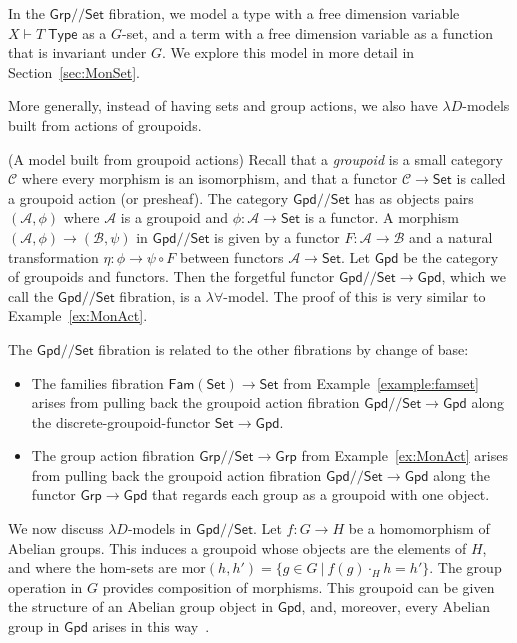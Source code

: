 \documentclass[a4paper,UKenglish]{lipics}
\newcommand{\msf}[1]{\mathsf{#1}} %
\newcommand{\Grp}{\msf{Grp}}
\newcommand{\Set}{\msf{Set}}
\newcommand{\Gpd}{\msf{Gpd}}
\newcommand{\Fam}[1]{\msf{Fam}(#1)}
\newcommand{\A}{\mathcal{A}}
\newcommand{\B}{\mathcal{B}}
\newcommand{\C}{\mathcal{C}}
\newcommand{\Lslice}[1]{#1/\!/\Set}
\newcommand{\GrpSet}{\Lslice{\Grp}}
\newcommand{\GpdSet}{\Lslice{\Gpd}}
\newcommand{\Tj}[2]{#1 \vdash #2 \; \msf{ Type}}
\newcommand{\Dvar}{X}
\begin{document}
\begin{example}
In the $\GrpSet$ fibration, we model a type with a free dimension variable $\Tj\Dvar T$ as a $G$-set, and a term with a free dimension variable as a function that is invariant under $G$. We explore this model in more detail in Section~\ref{sec:MonSet}.
\end{example}

More generally, instead of having sets and group actions, we also have $\lambda D$-models built from actions of groupoids.

\begin{example}(A model built from groupoid actions)
\label{ex:presheaves}
Recall that a \emph{groupoid} is a small category $\C$ where every morphism is an isomorphism, and that a functor $\C\to\Set$ is called a groupoid action (or presheaf). The category $\GpdSet$ has as objects pairs $(\A,\phi)$ where $\A$ is a groupoid and $\phi:\A\to\Set$ is a functor. A morphism $(\A,\phi) \rightarrow (\B,\psi)$ in $\GpdSet$ is given by a functor $F:\A\rightarrow \B$ and a natural transformation $\eta:\phi \to \psi \circ F$ between functors $\A \to\Set$.
Let $\Gpd$ be the category of groupoids and functors. Then the forgetful functor $\GpdSet\to \Gpd$, which we call the $\GpdSet$ fibration, is a $\lambda \forall$-model.
The proof of this is very similar to Example~\ref{ex:MonAct}.

The $\GpdSet$ fibration is related to the other fibrations by change of base:
\begin{itemize}
\item
The families fibration $\Fam\Set\to\Set$ from Example~\ref{example:famset} arises from pulling back the groupoid action fibration
$\GpdSet\to\Gpd$ along the discrete-groupoid-functor $\Set\to\Gpd$.
\item The group action fibration $\GrpSet\to\Grp$ from
  Example~\ref{ex:MonAct} arises from pulling back the groupoid action
  fibration $\GpdSet\to\Gpd$ along the functor $\Grp\to\Gpd$ that
  regards each group as a groupoid with one object.
\end{itemize}

We now discuss $\lambda D$-models in $\GpdSet$.
%
Let $f:G\to H$ be a homomorphism of Abelian groups. This induces a groupoid
whose objects are the elements of $H$, and where the hom-sets are $\mathrm{mor}(h,h')=\{g\in G~|~f(g)\cdot_Hh=h'\}$. The group operation in $G$ provides
composition of morphisms.
This groupoid can be given the structure of an Abelian group object in
$\Gpd$, and, moreover, every Abelian group in $\Gpd$ arises in this way~\cite{brown-spencer}.


\end{example}
\end{document}
